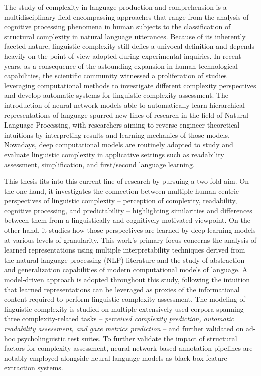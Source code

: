 \documentclass[a4paper, nobind]{templates/ociamthesis}
\begin{document}
The study of complexity in language production and comprehension is a multidisciplinary field encompassing approaches that range from the analysis of cognitive processing phenomena in human subjects to the classification of structural complexity in natural language utterances. Because of its inherently faceted nature, linguistic complexity still defies a univocal definition and depends heavily on the point of view adopted during experimental inquiries. In recent years, as a consequence of the astounding expansion in human technological capabilities, the scientific community witnessed a proliferation of studies leveraging computational methods to investigate different complexity perspectives and develop automatic systems for linguistic complexity assessment. The introduction of neural network models able to automatically learn hierarchical representations of language spurred new lines of research in the field of Natural Language Processing, with researchers aiming to reverse-engineer theoretical intuitions by interpreting results and learning mechanics of those models. Nowadays, deep computational models are routinely adopted to study and evaluate linguistic complexity in applicative settings such as readability assessment, simplification, and first/second language learning.

This thesis fits into this current line of research by pursuing a two-fold aim. On the one hand, it investigates the connection between multiple human-centric perspectives of linguistic complexity -- perception of complexity, readability, cognitive processing, and predictability -- highlighting similarities and differences between them from a linguistically and cognitively-motivated viewpoint. On the other hand, it studies how those perspectives are learned by deep learning models at various levels of granularity. This work's primary focus concerns the analysis of learned representations using multiple interpretability techniques derived from the natural language processing (NLP) literature and the study of abstraction and generalization capabilities of modern computational models of language. A model-driven approach is adopted throughout this study, following the intuition that learned representations can be leveraged as proxies of the informational content required to perform linguistic complexity assessment. The modeling of linguistic complexity is studied on multiple extensively-used corpora spanning three complexity-related tasks -- \emph{perceived complexity prediction, automatic readability assessment, and gaze metrics prediction} -- and further validated on ad-hoc psycholinguistic test suites. To further validate the impact of structural factors for complexity assessment, neural network-based annotation pipelines are notably employed alongside neural language models as black-box feature extraction systems.
\end{document}

